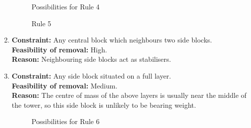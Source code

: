 \begin{enumerate}
	\begin{figure}[ht]
	\centering
	\begin{minipage}{.6\textwidth}
        \centering
        \begin{minipage}{.45\textwidth}
            \centering
        \end{minipage}
        \begin{minipage}{.45\textwidth}
            \centering
        \end{minipage}
        \caption{Possibilities for Rule 4}
    \end{minipage}
    \begin{minipage}{.3\textwidth}
        \centering
        \begin{minipage}{0.9\textwidth}
            \centering
        \end{minipage}
        \caption{Rule 5}
    \end{minipage}
    \end{figure}
	
	\item \textbf{Constraint:} Any central block which neighbours two side blocks.
	\\\textbf{Feasibility of removal:} High.
	\\\textbf{Reason:} Neighbouring side blocks act as stabilisers.
	
	\item \textbf{Constraint:} Any side block situated on a full layer.
	\\\textbf{Feasibility of removal:} Medium.
	\\\textbf{Reason:} The centre of mass of the above layers is usually near the middle of the tower, so this side block is unlikely to be bearing weight.
	
	\begin{figure}[ht]
        \centering
        \begin{minipage}{.3\textwidth}
            \centering
        \end{minipage}
        \begin{minipage}{.3\textwidth}
            \centering
        \end{minipage}
        \caption{Possibilities for Rule 6}
    \end{figure}
	
\end{enumerate}

